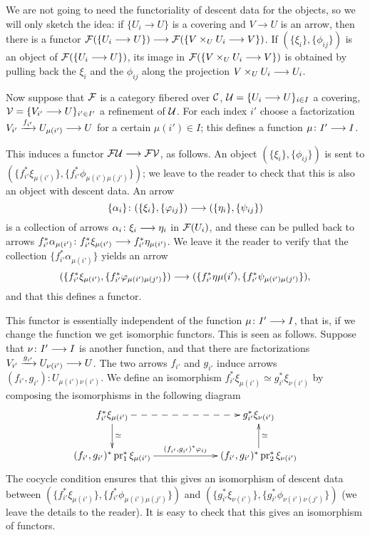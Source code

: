 \begin{4   STACKS}
\begin{4.1 Descent of objects of fibcats}
We are not going to need the functoriality of descent data for the objects, so we will only sketch the idea: if $\{U_{i} \to U\}$ is a covering and $V \to U$ is an arrow, then there is a functor $\cF(\{U_{i}\to U\}) \arr 
\cF(\{V \times_{U} U_{i} \to V\})$. If $(\{\xi_{i}\}, \{\phi_{ij}\})$ is an object of $\mathcal{F}(\{U_{i}\longrightarrow U\})$, its image in $\mathcal{F}(\{V \times_{U} U_{i} \longrightarrow V\})$ is obtained by pulling back the $\xi_{i}$ and the $\phi_{ij}$ along the projection $V \times_{U} U_{i} \arr U_{i}$.

Now suppose that $\mathcal{F}$ is a category fibered over $\mathcal{C}$, $\mathcal{U} = \{U_{i} \longrightarrow U\}_{i \in I}$ a covering, $\mathcal{V} = \{V_{i'} \longrightarrow U\}_{i' \in I'}$ a refinement of $\mathcal{U}$. For each index $i'$ choose a factorization $V_{i'} \xrightarrow{f_{i'}} U_{\mu(i')} \arr U$ for a certain $\mu(i') \in I$; this defines a function $\mu\colon I' \arr I$.

This induces a functor $\cF\cU \arr \cF\cV$, as follows. An object $(\{\xi_{i}\}, \{\phi_{ij}\})$ is sent to $(\{f_{i'}^{*}\xi_{\mu(i')}\}, \{f_{i'}^{*}\phi_{\mu(i')\mu(j')}\})$; we leave to the reader to check that this is also an object with descent data. An arrow 
   \[
   \{\alpha_{i}\}\colon (\{\xi_{i}\}, \{\phi_{ij}\}) \arr
                        (\{\eta_{i}\}, \{\psi_{ij}\})
   \]
is a collection of arrows $\alpha_{i}\colon \xi_{i}\arr \eta_{i}$ in $\mathcal{F}(U_{i})$, and these can be pulled back to arrows $f_{i'}^{*}\alpha_{\mu(i')}\colon f_{i'}^{*}\xi_{\mu(i')} \arr f_{i'}^{*}\eta_{\mu(i')}$. We leave it the reader to verify that the collection $\{f_{i'}^{*}\alpha_{\mu(i')}\}$ yields an arrow
   \[
   (\{f_{i'}^{*}\xi_{\mu(i')}, \{f_{i'}^{*}\phi_{\mu(i')\mu(j')}\})\arr
   (\{f_{i'}^{*}\eta{\mu(i')}, \{f_{i'}^{*}\psi_{\mu(i')\mu(j')}\}),
   \]
and that this defines a functor.

This functor is essentially independent of the function $\mu\colon I' \arr I$, that is, if we change the function we get isomorphic functors. This is seen as follows. Suppose that $\nu\colon I' \arr I$ is another function, and that there are factorizations $V_{i'} \xrightarrow{g_{i'}} U_{\nu(i')} \arr U$. The two arrows $f_{i'}$ and $g_{i'}$ induce arrows $(f_{i'}, g_{i'})\colon U_{\mu(i') \nu(i')}$. We define an isomorphism $f_{i'}^{*}\xi_{\mu(i')} \simeq g_{i'}^{*}\xi_{\nu(i')}$ by composing the isomorphisms in the following diagram
   \[
   \xymatrix@C+40pt{
   f_{i'}^{*}\xi_{\mu(i')}\ar@{-->}[r]\ar[d]^{\simeq} &
      g_{i'}^{*}\xi_{\nu(i')}
      \\
   (f_{i'}, g_{i'})^{*}\pr_{1}^{*}\xi_{\mu(i')}
         \ar[r]^-{(f_{i'}, g_{i'})^{*}\phi_{ij}} & 
      (f_{i'}, g_{i'})^{*}\pr_{2}^{*}\xi_{\nu(i')}\ar[u]_{\simeq}
   }
   \]
The cocycle condition ensures that this gives an isomorphism of descent data between $(\{f_{i'}^{*}\xi_{\mu(i')}\}, \{f_{i'}^{*}\phi_{\mu(i')\mu(j')}\})$ and $(\{g_{i'}^{*}\xi_{\nu(i')}\}, \{g_{i'}^{*}\phi_{\nu(i')\nu(j')}\})$ (we leave the details to the reader). It is easy to check that this gives an isomorphism of functors.


\end{4.1 Descent of objects of fibcats}
\end{4   STACKS}
